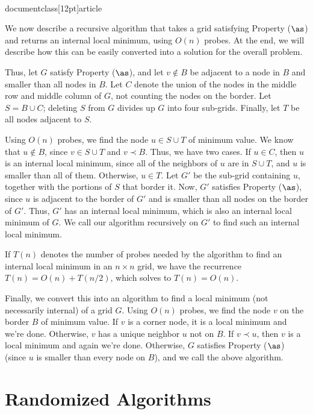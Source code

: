 \\documentclass[12pt]{article}
\begin{document}
\begin{enumerate}
{We now describe a recursive algorithm that takes a grid
satisfying Property ($\as$) and returns an internal local minimum,
using $O(n)$ probes.
At the end, we will describe how this can be easily converted
into a solution for the overall problem.

Thus, let $G$ satisfy Property ($\as$), and let 
$v \not\in B$ be adjacent to a node in $B$ 
and smaller than all nodes in $B$.
Let $C$ denote the union of the nodes in the middle row
and middle column of $G$, not counting the nodes on the border.
Let $S = B \cup C$; deleting $S$ from $G$ divides up 
$G$ into four sub-grids.
Finally, let $T$ be all nodes adjacent to $S$.

Using $O(n)$ probes, we find the node $u \in S \cup T$
of minimum value.
We know that $u \not\in B$, since $v \in S \cup T$
and $v \prec B$.
Thus, we have two cases.
If $u \in C$, then $u$ is an internal local minimum,
since all of the neighbors of $u$ are in $S \cup T$,
and $u$ is smaller than all of them.
Otherwise, $u \in T$.
Let $G'$ be the sub-grid containing $u$, together
with the portions of $S$ that border it.
Now, $G'$ satisfies Property ($\as$), since $u$ is
adjacent to the border of $G'$ and is smaller
than all nodes on the border of $G'$.
Thus, $G'$ has an internal local minimum,
which is also an internal local minimum of $G$.
We call our algorithm recursively on $G'$ to find such
an internal local minimum.

If $T(n)$ denotes the number of probes needed by the algorithm to 
find an internal local minimum in an $n \times n$ grid, 
we have the recurrence $T(n) = O(n) + T(n/2)$, which solves to
$T(n) = O(n)$.

Finally, we convert this into an algorithm to find a local
minimum (not necessarily internal) of a grid $G$.
Using $O(n)$ probes, we find the node $v$ on the border $B$
of minimum value.
If $v$ is a corner node, it is a local minimum and we're done.
Otherwise, $v$ has a unique neighbor $u$ not on $B$.
If $v \prec u$, then $v$ is a local minimum and again we're done.
Otherwise, $G$ satisfies Property ($\as$) (since $u$ 
is smaller than every node on $B$), and we call the above algorithm.

}

\end{enumerate}


\section{Randomized Algorithms}
\end{document}
